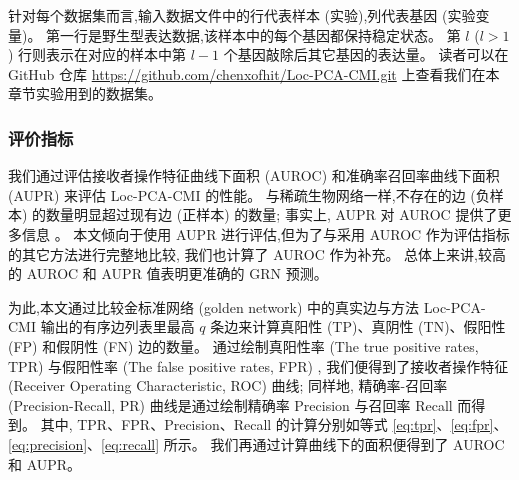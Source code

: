 \begin{table} [!htbp]
  \caption{实验所使用的数据集描述} 
  \label{tbl} 
\end{table} 

针对每个数据集而言,输入数据文件中的行代表样本 (实验),列代表基因 (实验变量)。
第一行是野生型表达数据,该样本中的每个基因都保持稳定状态。
第 $l$ ($l>1$) 行则表示在对应的样本中第 $l-1$ 个基因敲除后其它基因的表达量。
读者可以在 GitHub 仓库 \url{https://github.com/chenxofhit/Loc-PCA-CMI.git} 上查看我们在本章节实验用到的数据集。

\subsubsection{评价指标}

我们通过评估接收者操作特征曲线下面积 (AUROC) 和准确率召回率曲线下面积 (AUPR) 来评估 Loc-PCA-CMI 的性能。
与稀疏生物网络一样,不存在的边 (负样本) 的数量明显超过现有边 (正样本) 的数量; 
事实上, AUPR 对 AUROC 提供了更多信息  。
本文倾向于使用 AUPR 进行评估,但为了与采用 AUROC 作为评估指标的其它方法进行完整地比较,
我们也计算了 AUROC 作为补充。
总体上来讲,较高的 AUROC 和 AUPR 值表明更准确的 GRN 预测。

为此,本文通过比较金标准网络 (golden network) 中的真实边与方法 Loc-PCA-CMI 输出的有序边列表里最高 $q$ 条边来计算真阳性 (TP)、真阴性 (TN)、假阳性 (FP) 和假阴性 (FN) 边的数量。
通过绘制真阳性率 (The true positive rates, TPR) 与假阳性率 (The false positive rates, FPR) ,
我们便得到了接收者操作特征 (Receiver Operating Characteristic, ROC) 曲线; 
同样地,
精确率-召回率 (Precision-Recall, PR) 曲线是通过绘制精确率 Precision 与召回率 Recall 而得到。
其中, TPR、FPR、Precision、Recall 的计算分别如等式 \ref{eq:tpr}、\ref{eq:fpr}、\ref{eq:precision}、\ref{eq:recall} 所示。
我们再通过计算曲线下的面积便得到了 AUROC 和 AUPR。

